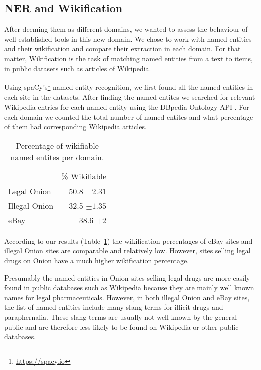 \documentclass[11pt,a4paper,table]{article}
\begin{document}
\subsection{NER and Wikification}

After deeming them as different domains, we wanted to assess the behaviour of well established tools in this new domain. We chose to work with named entities and their wikification and compare their extraction in each domain. For that matter, Wikification is the task of matching 
named entities from a text to items, in public datasets such as articles of Wikipedia.

Using spaCy's\footnote{\url{https://spacy.io}}
named entity recognition, we first found all the named
entities in each site in the datasets. After finding the named entites
we searched for relevant Wikipedia entries for each named entity using
the DBpedia Ontology API \cite{isem2013daiber}.
For each domain we counted the total number
of named entites and what percentage of them had corresponding Wikipedia
articles.

\begin{table}
\begin{center}
\begin{tabular}{lr}
 & \% Wikifiable\\
Legal Onion & 50.8 $\pm2.31$\\
Illegal Onion & 32.5 $\pm1.35$\\
eBay & 38.6 $\pm2$\\
\end{tabular}
\end{center}
\caption{Percentage of wikifiable named entites per domain.\label{ta:wiki}}
\end{table}
According to our results (Table~\ref{ta:wiki}) the wikification percentages of
eBay sites and illegal Onion sites are comparable and relatively low.
However, sites selling legal drugs on Onion have a much higher wikification
percentage.

Presumably the named entities in Onion sites selling legal drugs are
more easily found in public databases such as Wikipedia because they
are mainly well known names for legal pharmaceuticals. However, in
both illegal Onion and eBay sites, the list of named entities include
many slang terms for illicit drugs and paraphernalia. These slang terms
are usually not well known by the general public and are therefore
less likely to be found on Wikipedia or other public databases.
\end{document}
